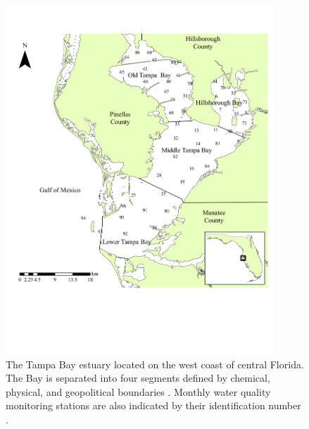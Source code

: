 \documentclass{svjour3}\usepackage[]{graphicx}\usepackage[]{color}
\begin{document}
\clearpage


\begin{figure}
\centering
\includegraphics[width=0.9\textwidth]{figs/tb_map.pdf}
\caption{The Tampa Bay estuary located on the west coast of central Florida. The Bay is separated into four segments defined by chemical, physical, and geopolitical boundaries \cite{Lewis85}. Monthly water quality monitoring stations are also indicated by their identification number \cite{Boler01}.}
\label{fig:tb_map}
\end{figure}

\end{document}
